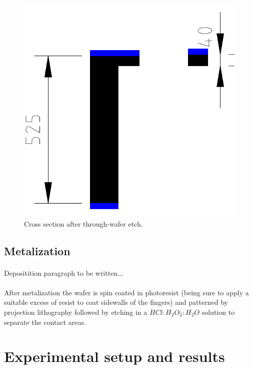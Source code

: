 \documentclass[twocolumn]{article}
\begin{document}
\begin{figure}[h!]
\begin{center}
\includegraphics[scale=0.25]{CrossSection2.png}
\end{center}
\caption{Cross section after through-wafer etch.}
\label{xc2}
\end{figure}

\subsection{Metalization}
\paragraph*{}
Depositition paragraph to be written...

\paragraph*{}
After metalization the wafer is spin coated in photoresist (being sure to apply a suitable excess
of resist to coat sidewalls of the fingers) and patterned by projection lithography followed by
etching in a $HCl:H_2O_2:H_2O$ solution to separate the contact areas.


\section{Experimental setup and results}
\end{document}
